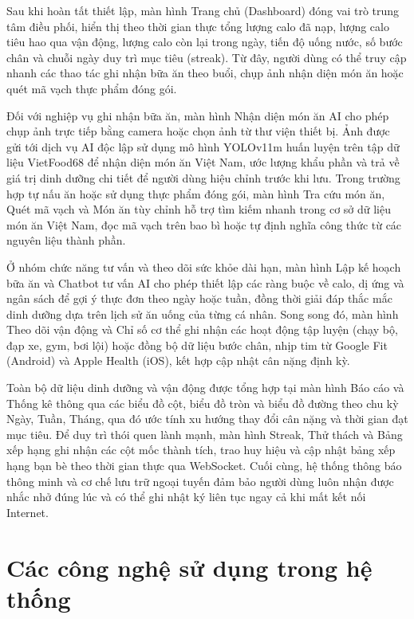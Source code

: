 \documentclass[../main.tex]{subfiles}
\begin{document}
Sau khi hoàn tất thiết lập, màn hình Trang chủ (Dashboard) đóng vai trò trung tâm điều phối, hiển thị theo thời gian thực tổng lượng calo đã nạp, lượng calo tiêu hao qua vận động, lượng calo còn lại trong ngày, tiến độ uống nước, số bước chân và chuỗi ngày duy trì mục tiêu (streak). Từ đây, người dùng có thể truy cập nhanh các thao tác ghi nhận bữa ăn theo buổi, chụp ảnh nhận diện món ăn hoặc quét mã vạch thực phẩm đóng gói.

Đối với nghiệp vụ ghi nhận bữa ăn, màn hình Nhận diện món ăn AI cho phép chụp ảnh trực tiếp bằng camera hoặc chọn ảnh từ thư viện thiết bị. Ảnh được gửi tới dịch vụ AI độc lập sử dụng mô hình YOLOv11m huấn luyện trên tập dữ liệu VietFood68 để nhận diện món ăn Việt Nam, ước lượng khẩu phần và trả về giá trị dinh dưỡng chi tiết để người dùng hiệu chỉnh trước khi lưu. Trong trường hợp tự nấu ăn hoặc sử dụng thực phẩm đóng gói, màn hình Tra cứu món ăn, Quét mã vạch và Món ăn tùy chỉnh hỗ trợ tìm kiếm nhanh trong cơ sở dữ liệu món ăn Việt Nam, đọc mã vạch trên bao bì hoặc tự định nghĩa công thức từ các nguyên liệu thành phần.

Ở nhóm chức năng tư vấn và theo dõi sức khỏe dài hạn, màn hình Lập kế hoạch bữa ăn và Chatbot tư vấn AI cho phép thiết lập các ràng buộc về calo, dị ứng và ngân sách để gợi ý thực đơn theo ngày hoặc tuần, đồng thời giải đáp thắc mắc dinh dưỡng dựa trên lịch sử ăn uống của từng cá nhân. Song song đó, màn hình Theo dõi vận động và Chỉ số cơ thể ghi nhận các hoạt động tập luyện (chạy bộ, đạp xe, gym, bơi lội) hoặc đồng bộ dữ liệu bước chân, nhịp tim từ Google Fit (Android) và Apple Health (iOS), kết hợp cập nhật cân nặng định kỳ.

Toàn bộ dữ liệu dinh dưỡng và vận động được tổng hợp tại màn hình Báo cáo và Thống kê thông qua các biểu đồ cột, biểu đồ tròn và biểu đồ đường theo chu kỳ Ngày, Tuần, Tháng, qua đó ước tính xu hướng thay đổi cân nặng và thời gian đạt mục tiêu. Để duy trì thói quen lành mạnh, màn hình Streak, Thử thách và Bảng xếp hạng ghi nhận các cột mốc thành tích, trao huy hiệu và cập nhật bảng xếp hạng bạn bè theo thời gian thực qua WebSocket. Cuối cùng, hệ thống thông báo thông minh và cơ chế lưu trữ ngoại tuyến đảm bảo người dùng luôn nhận được nhắc nhở đúng lúc và có thể ghi nhật ký liên tục ngay cả khi mất kết nối Internet.

\section{Các công nghệ sử dụng trong hệ thống}
\label{sec:1.2}
\end{document}

